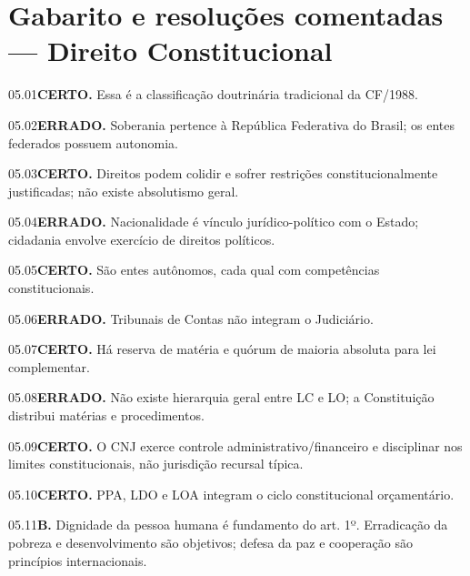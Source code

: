 \section{Gabarito e resoluções comentadas — Direito Constitucional}

\begin{solucao}{05.01}\textbf{CERTO.} Essa é a classificação doutrinária tradicional da CF/1988.\end{solucao}
\begin{solucao}{05.02}\textbf{ERRADO.} Soberania pertence à República Federativa do Brasil; os entes federados possuem autonomia.\end{solucao}
\begin{solucao}{05.03}\textbf{CERTO.} Direitos podem colidir e sofrer restrições constitucionalmente justificadas; não existe absolutismo geral.\end{solucao}
\begin{solucao}{05.04}\textbf{ERRADO.} Nacionalidade é vínculo jurídico-político com o Estado; cidadania envolve exercício de direitos políticos.\end{solucao}
\begin{solucao}{05.05}\textbf{CERTO.} São entes autônomos, cada qual com competências constitucionais.\end{solucao}
\begin{solucao}{05.06}\textbf{ERRADO.} Tribunais de Contas não integram o Judiciário.\end{solucao}
\begin{solucao}{05.07}\textbf{CERTO.} Há reserva de matéria e quórum de maioria absoluta para lei complementar.\end{solucao}
\begin{solucao}{05.08}\textbf{ERRADO.} Não existe hierarquia geral entre LC e LO; a Constituição distribui matérias e procedimentos.\end{solucao}
\begin{solucao}{05.09}\textbf{CERTO.} O CNJ exerce controle administrativo/financeiro e disciplinar nos limites constitucionais, não jurisdição recursal típica.\end{solucao}
\begin{solucao}{05.10}\textbf{CERTO.} PPA, LDO e LOA integram o ciclo constitucional orçamentário.\end{solucao}
\begin{solucao}{05.11}\textbf{B.} Dignidade da pessoa humana é fundamento do art. 1º. Erradicação da pobreza e desenvolvimento são objetivos; defesa da paz e cooperação são princípios internacionais.\end{solucao}
